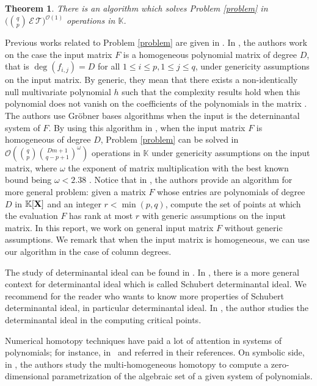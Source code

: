 \documentclass[11pt]{article}
\numberwithin{Property}{section}
\newtheorem{Theorem}{Theorem}%
\numberwithin{Theorem}{section}
\numberwithin{Proposition}{section}
\numberwithin{Lemma}{section}
\numberwithin{Corollary}{section}
\numberwithin{Definition}{section}
\numberwithin{Remark}{section}
\numberwithin{Conjecture}{section}
\numberwithin{Problem}{section}
\numberwithin{Claim}{section}
\theoremstyle{definition}
\numberwithin{Example}{section}
\renewcommand{\leq}{\leqslant}
\newcommand{\bigO}[1]{\mathcal{O}(#1)} %
\newcommand{\expmatmul}{\omega} %
\newcommand{\field}{\mathbb{K}} %
\newcommand{\mat}[1]{\mathbf{\MakeUppercase{#1}}} %
\begin{document}
\begin{Theorem} There is an algorithm which solves Problem \ref{problem} in $\big({{q}\choose{p}} \,\mathcal{E}\,\mathcal{T}\big)^{\bigO{1}}$ operations in $\field$.
\end{Theorem}

Previous works related to Problem \ref{problem} are given in \cite{FauSafSpa13, Miller04, Spa14, SaSc16, NieRan09}. In \cite{FauSafSpa13}, the authors work on the case the input matrix $F$ is a homogeneous polynomial matrix of degree $D$, that is $\deg(f_{i,j}) = D$ for all $1 \leq i \leq p, 1 \leq j \leq q$, under genericity assumptions on the input matrix. By generic, they mean that there exists a non-identically null multivariate polynomial $h$ such that the complexity results hold when this polynomial does not vanish on the coefficients of the polynomials in the matrix \cite{FauSafSpa13}. The authors use Gröbner bases algorithms when the input is the deterninantal system of $F$. By using this algorithm in  \cite{FauSafSpa13}, when the input matrix $F$ is homogeneous of degree $D$, Problem \ref{problem} can be solved in $\bigO{{q \choose p}{{Dm+1} \choose {q-p+1}}^{\expmatmul}}$ operations in $\field$ under genericity assumptions on the input matrix, where $\expmatmul$ the exponent of matrix multiplication with the best known bound being $\expmatmul < 2.38$ \cite{CopWin90, LeGall14}. Notice that in \cite{FauSafSpa13}, the authors provide an algorithm for more general problem: given a matrix $F$ whose entries are polynomials of degree $D$ in $\field[\mat{X}]$ and an integer $r < \min(p,q)$, compute the set of points at which the evaluation $F$ has rank at most $r$ with generic assumptions on the input matrix. In this report, we work on general input matrix $F$ without generic assumptions. We remark that when the input matrix is homogeneous, we can use our algorithm in the case of column degrees. 

The study of determinantal ideal can be found in \cite{Miller04, Spa14}. In \cite[~Chapters 15--16]{Miller04}, there is a more general context for determinantal ideal which is called Schubert determinantal ideal. We recommend \cite[~Chapters 15--16]{Miller04} for the reader who wants to know more properties of Schubert determinantal ideal, in particular determinantal ideal. In \cite{Spa14}, the author studies the determinantal ideal in the computing critical points. 

Numerical homotopy techniques have paid a lot of attention in systems of polynomials; for instance, in~\cite{MORGAN872, MORGAN87, Morgan89,SAWC05,Zul88} and referred in their references. On symbolic side, in \cite{SaSc16}, the authors study the multi-homogeneous homotopy to compute a zero-dimensional parametrization of the algebraic set of a given system of polynomials. 
\end{document}
